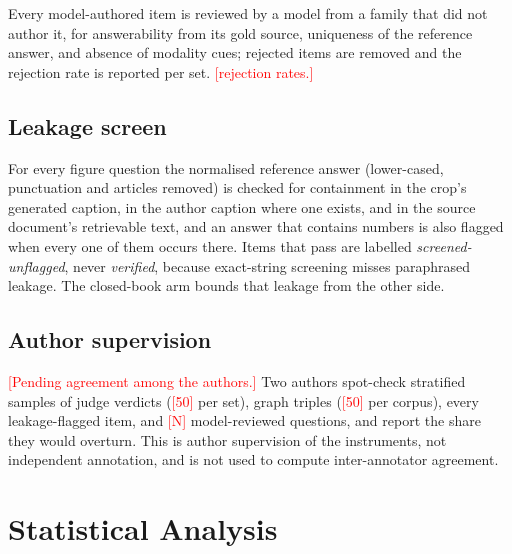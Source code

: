 \documentclass[preprint,12pt]{elsarticle}
\newcommand{\tbd}[1]{\textcolor{red}{[#1]}}
\begin{document}
Every model-authored item is reviewed by a model from a family that did not
author it, for answerability from its gold source, uniqueness of the
reference answer, and absence of modality cues; rejected items are removed and
the rejection rate is reported per set. \tbd{rejection rates.}

\subsection{Leakage screen}
\label{sec:leakscreen}

For every figure question the normalised reference answer (lower-cased,
punctuation and articles removed) is checked for containment in the crop's
generated caption, in the author caption where one exists, and in the source
document's retrievable text, and an answer that contains numbers is also
flagged when every one of them occurs there. Items that pass are labelled
\emph{screened-unflagged}, never \emph{verified}, because exact-string
screening misses paraphrased leakage. The closed-book arm bounds that leakage
from the other side.

\subsection{Author supervision}

\tbd{Pending agreement among the authors.} Two authors spot-check stratified
samples of judge verdicts (\tbd{50} per set), graph triples (\tbd{50} per
corpus), every leakage-flagged item, and \tbd{N} model-reviewed questions, and
report the share they would overturn. This is author supervision of the
instruments, not independent annotation, and is not used to compute
inter-annotator agreement.

\section{Statistical Analysis}
\label{sec:stats}
\end{document}
